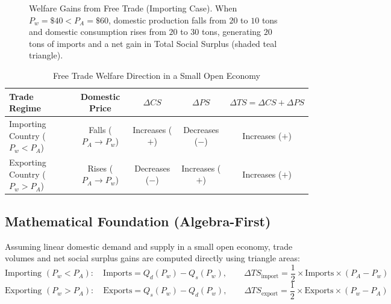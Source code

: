 \documentclass[11pt,letterpaper]{article}
\begin{document}
\begin{figure}[htbp]
\caption{Welfare Gains from Free Trade (Importing Case). When $P_w = \$40 < P_A = \$60$, domestic production falls from $20$ to $10$ tons and domestic consumption rises from $20$ to $30$ tons, generating $20$ tons of imports and a net gain in Total Social Surplus (shaded teal triangle).}
\label{fig:free_trade_imports}
\end{figure}

\begin{table}[htbp]
\centering
\caption{Free Trade Welfare Direction in a Small Open Economy}
\label{tab:free_trade_summary}
\begin{tabular}{lcccc}
\toprule
\textbf{Trade Regime} & \textbf{Domestic Price} & \textbf{$\Delta CS$} & \textbf{$\Delta PS$} & \textbf{$\Delta TS = \Delta CS + \Delta PS$} \\
\midrule
Importing Country ($P_w < P_A$) & Falls ($P_A \to P_w$) & Increases ($+$) & Decreases ($-$) & Increases ($+$) \\
Exporting Country ($P_w > P_A$) & Rises ($P_A \to P_w$) & Decreases ($-$) & Increases ($+$) & Increases ($+$) \\
\bottomrule
\end{tabular}
\end{table}

\subsection*{Mathematical Foundation (Algebra-First)}
Assuming linear domestic demand and supply in a small open economy, trade volumes and net social surplus gains are computed directly using triangle areas:
\begin{equation}
\text{Importing } (P_w < P_A): \quad \text{Imports} = Q_d(P_w) - Q_s(P_w), \qquad \Delta TS_{\text{import}} = \frac{1}{2} \times \text{Imports} \times (P_A - P_w)
\end{equation}
\begin{equation}
\text{Exporting } (P_w > P_A): \quad \text{Exports} = Q_s(P_w) - Q_d(P_w), \qquad \Delta TS_{\text{export}} = \frac{1}{2} \times \text{Exports} \times (P_w - P_A)
\end{equation}
\end{document}
